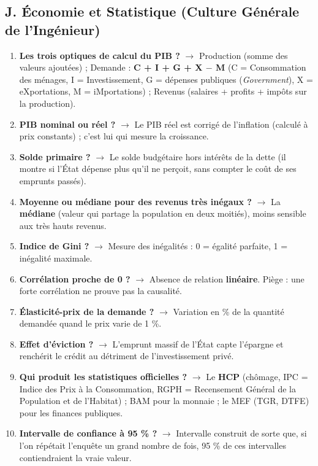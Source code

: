\subsection*{J. Économie et Statistique (Culture Générale de l'Ingénieur)}
\begin{enumerate}[leftmargin=*]
    \item \textbf{Les trois optiques de calcul du PIB ?} $\rightarrow$ Production (somme des valeurs ajoutées) ; Demande : \textbf{C + I + G + X $-$ M} (C = Consommation des ménages, I = Investissement, G = dépenses publiques (\textit{Government}), X = eXportations, M = iMportations) ; Revenus (salaires + profits + impôts sur la production).
    \item \textbf{PIB nominal ou réel ?} $\rightarrow$ Le PIB réel est corrigé de l'inflation (calculé à prix constants) ; c'est lui qui mesure la croissance.
    \item \textbf{Solde primaire ?} $\rightarrow$ Le solde budgétaire hors intérêts de la dette (il montre si l'État dépense plus qu'il ne perçoit, sans compter le coût de ses emprunts passés).
    \item \textbf{Moyenne ou médiane pour des revenus très inégaux ?} $\rightarrow$ La \textbf{médiane} (valeur qui partage la population en deux moitiés), moins sensible aux très hauts revenus.
    \item \textbf{Indice de Gini ?} $\rightarrow$ Mesure des inégalités : 0 = égalité parfaite, 1 = inégalité maximale.
    \item \textbf{Corrélation proche de 0 ?} $\rightarrow$ Absence de relation \textbf{linéaire}. Piège : une forte corrélation ne prouve pas la causalité.
    \item \textbf{Élasticité-prix de la demande ?} $\rightarrow$ Variation en \% de la quantité demandée quand le prix varie de 1 \%.
    \item \textbf{Effet d'éviction ?} $\rightarrow$ L'emprunt massif de l'État capte l'épargne et renchérit le crédit au détriment de l'investissement privé.
    \item \textbf{Qui produit les statistiques officielles ?} $\rightarrow$ Le \textbf{HCP} (chômage, IPC = Indice des Prix à la Consommation, RGPH = Recensement Général de la Population et de l'Habitat) ; BAM pour la monnaie ; le MEF (TGR, DTFE) pour les finances publiques.
    \item \textbf{Intervalle de confiance à 95 \% ?} $\rightarrow$ Intervalle construit de sorte que, si l'on répétait l'enquête un grand nombre de fois, 95 \% de ces intervalles contiendraient la vraie valeur.
\end{enumerate}
